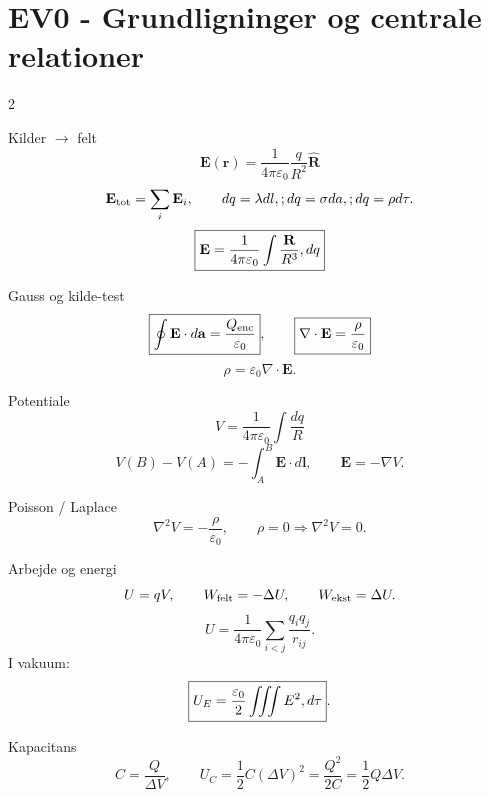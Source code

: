 \documentclass[10pt,a4paper]{article}
\begin{document}
\section*{EV0 - Grundligninger og centrale relationer}
{}
\begin{multicols}{2}
\begin{quickbox}{Kilder $\to$ felt}
\[
\boxed{\mathbf E(\mathbf r)=\frac{1}{4\pi\varepsilon_0}\frac{q}{R^2}\hat{\mathbf R}}
\]
\[
\mathbf E_{\rm tot}=\sum_i\mathbf E_i,
\qquad
 dq=\lambda dl,\\;dq=\sigma da,\\;dq=\rho d\tau.
\]
\[
\boxed{\mathbf E=\frac{1}{4\pi\varepsilon_0}\int\frac{\mathbf R}{R^3}\\,dq}
\]
\end{quickbox}
\begin{quickbox}{Gauss og kilde-test}
\[
\boxed{\oint\mathbf E\cdot d\mathbf a=\frac{Q_{\rm enc}}{\varepsilon_0}},
\qquad
\boxed{\nabla\cdot\mathbf E=\frac{\rho}{\varepsilon_0}}
\]
\[
\boxed{\rho=\varepsilon_0\nabla\cdot\mathbf E}.
\]
\end{quickbox}
\begin{quickbox}{Potentiale}
\[
\boxed{V=\frac{1}{4\pi\varepsilon_0}\int\frac{dq}{R}}
\]
\[
\boxed{V(B)-V(A)=-\int_A^B\mathbf E\cdot d\mathbf l},
\qquad
\boxed{\mathbf E=-\nabla V}.
\]
\end{quickbox}
\begin{quickbox}{Poisson / Laplace}
\[
\boxed{\nabla^2V=-\frac{\rho}{\varepsilon_0}},
\qquad
\boxed{\rho=0\Rightarrow\nabla^2V=0}.
\]
\end{quickbox}
\begin{quickbox}{Arbejde og energi}
\[
U=qV,
\qquad W_{\rm felt}=-\Delta U,
\qquad W_{\rm ekst}=\Delta U.
\]
\[
U=\frac{1}{4\pi\varepsilon_0}\sum_{i<j}\frac{q_iq_j}{r_{ij}}.
\]
I vakuum:
\[
\boxed{U_E=\frac{\varepsilon_0}{2}\iiint E^2\\,d\tau}.
\]
\end{quickbox}
\begin{quickbox}{Kapacitans}
\[
\boxed{C=\frac{Q}{\Delta V}},
\qquad
\boxed{U_C=\frac12C(\Delta V)^2=\frac{Q^2}{2C}=\frac12Q\Delta V}.
\]
\end{quickbox}
\end{multicols}

\newpage
\end{document}

